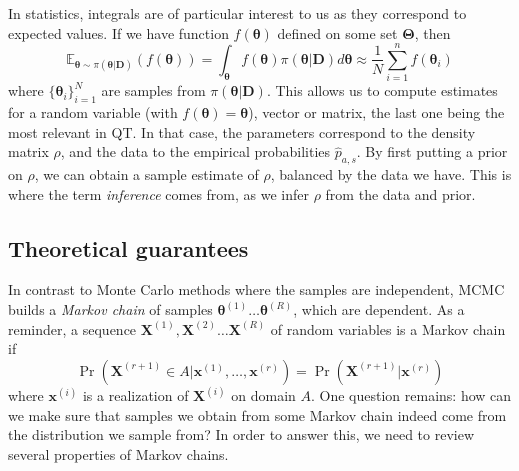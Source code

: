 \documentclass[12pt]{memoir}
\newcommand{\mb}{\mathbf}
\newcommand{\ti}{\textit}
\newcommand{\btheta}{\boldsymbol{\theta}}
\begin{document}
In statistics, integrals are of particular interest to us as they correspond to expected values. If we have function $f(\boldsymbol{\theta})$ defined on some set $\boldsymbol{\Theta}$, then
\begin{equation}
    \mathbb E_{\boldsymbol \theta \sim \pi(\btheta|\mb{D})}\left(f(\boldsymbol{\theta})\right) = \int_{\boldsymbol{\theta}} f(\boldsymbol{\theta})\pi(\btheta|\mb{D}) d\boldsymbol{\btheta} \approx \frac{1}{N} \sum_{i=1}^{n} f(\boldsymbol{\theta}_i)
\end{equation}
where $\{\boldsymbol{\theta}_i\}^N_{i=1}$ are samples from $\pi(\btheta|\mb{D})$. This allows us to compute estimates for a random variable (with $f(\btheta) = \btheta$), vector or matrix, the last one being the most relevant in QT. In that case, the parameters correspond to the density matrix $\rho$, and the data to the empirical probabilities $\hat p_{a,s}$. By first putting a prior on $\rho$, we can obtain a sample estimate of $\rho$, balanced by the data we have. This is where the term \ti{inference} comes from, as we infer $\rho$ from the data and prior.

\subsection{Theoretical guarantees}\label{section:background:mcmc:theory}
In contrast to Monte Carlo methods where the samples are independent, MCMC builds a \ti{Markov chain} of samples $\btheta^{(1)} \dots \btheta^{(R)}$, which are dependent. As a reminder, a sequence $\mb X^{(1)}, \mb X^{(2)} \dots \mb X^{(R)}$ of random variables is a Markov chain if
\begin{equation}
    \Pr(\mb X^{(r+1)} \in A|\mb x^{(1)}, \dots, \mb x^{(r)}) = \Pr(\mb X^{(r+1)}|\mb x^{(r)})
\end{equation}
where $\mb x^{(i)}$ is a realization of $\mb X^{(i)}$ on domain $A$. One question remains: how can we make sure that samples we obtain from some Markov chain indeed come from the distribution we sample from? In order to answer this, we need to review several properties of Markov chains.\medbreak
\end{document}
